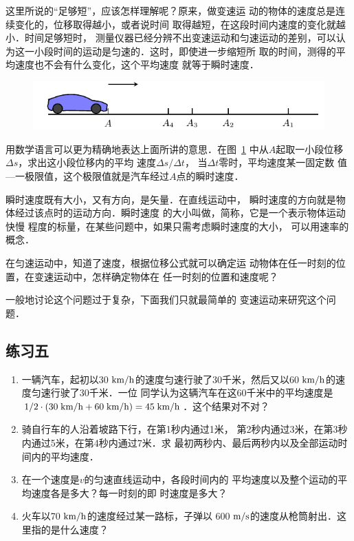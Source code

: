 这里所说的“足够短”，应该怎样理解呢？原来，做变速运
动的物体的速度总是连续变化的，位移取得越小，或者说时间
取得越短，在这段时间内速度的变化就越小．时间足够短时，
测量仪器已经分辨不出变速运动和匀速运动的差别，可以认
为这一小段时间的运动是匀速的．这时，即使进一步缩短所
取的时间，测得的平均速度也不会有什么变化，这个平均速度
就等于瞬时速度．

\begin{figure}[htp]
    \centering
    \includegraphics{fig/A/2-14.pdf}
    \caption{}\label{fig_A_2-14}
\end{figure}

用数学语言可以更为精确地表达上面所讲的意思．在图~\ref{fig_A_2-14} 
中从$A$起取一小段位移$\Delta s$，求出这小段位移内的平均
速度$\Delta s/\Delta t$， 当$\Delta t$零时，平均速度某一固定数
值—一极限值，这个极限值就是汽车经过$A$点的瞬时速度．

    瞬时速度既有大小，又有方向，是矢量．在直线运动中，
瞬时速度的方向就是物体经过该点时的运动方向．瞬时速度
的大小叫做，简称，它是一个表示物体运动快慢
程度的标量，在某些问题中，如果只需考虑瞬时速度的大小，
可以用速率的概念．

    在匀速运动中，知道了速度，根据位移公式就可以确定运
动物体在任一时刻的位置，在变速运动中，怎样确定物体在
任一时刻的位置和速度呢？

    一般地讨论这个问题过于复杂，下面我们只就最简单的
变速运动来研究这个问题．

\subsection*{练习五}

\begin{enumerate}
    \item 一辆汽车，起初以30$\;\text{km}/\text{h}$的速度匀速行驶了30千米，然后又以60$\;\text{km}/\text{h}$的速度匀速行驶了30千米．一位
    同学认为这辆汽车在这60千米中的平均速度是$1/2\cdot(30 \;\text{km}/\text{h}+60\;\text{km}/\text{h})=45\;\text{km}/\text{h}$．这个结果对不对？
    \item 骑自行车的人沿着坡路下行，在第1秒内通过1米，
    第2秒内通过3米，在第3秒内通过5米，在第4秒内通过7米．求
    最初两秒内、最后两秒内以及全部运动时间内的平均速度．
    \item 在一个速度是$v$的匀速直线运动中，各段时间内的
    平均速度以及整个运动的平均速度各是多大？每一时刻的即
    时速度是多大？
    \item 火车以70$\;\text{km}/\text{h}$的速度经过某一路标，子弹以
    600$\;\text{m}/\text{s}$的速度从枪筒射出．这里指的是什么速度？
    
\end{enumerate}


